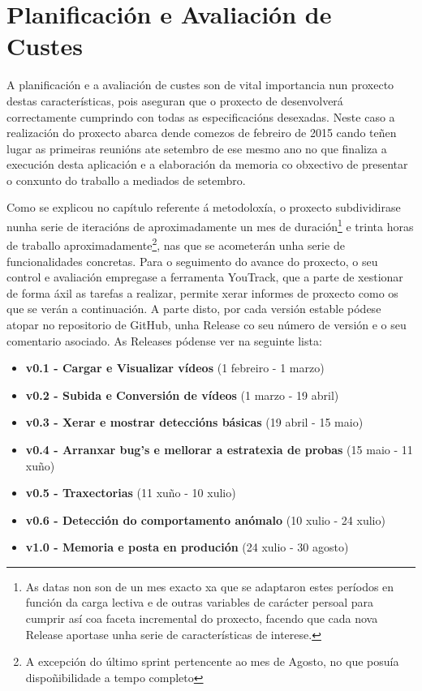 \chapter{Planificación e Avaliación de Custes}

A planificación e a avaliación de custes son de vital importancia nun proxecto destas 
características, pois aseguran que o proxecto de desenvolverá correctamente cumprindo con todas as
especificacións desexadas. Neste caso a realización do proxecto abarca dende comezos de febreiro de
2015 cando teñen lugar as primeiras reunións ate setembro de ese mesmo ano no que finaliza a 
execución desta aplicación e a elaboración da memoria co obxectivo de presentar o conxunto do 
traballo a mediados de setembro.

Como se explicou no capítulo referente á metodoloxía, o proxecto subdividirase nunha serie de 
iteracións de aproximadamente un mes de duración\footnote{As datas non son de un mes exacto xa que
se adaptaron estes períodos en función da carga lectiva e de outras variables de carácter persoal 
para cumprir así coa faceta incremental do proxecto, facendo que cada nova Release aportase unha
serie de características de interese.} e trinta horas de traballo aproximadamente\footnote{ 
A excepción do último sprint pertencente ao mes de Agosto, no que posuía dispoñibilidade a tempo
completo},
nas que se acometerán unha serie de 
funcionalidades concretas. Para o seguimento do avance do proxecto, o seu control e avaliación 
empregase a ferramenta YouTrack, que a parte de xestionar de forma áxil as tarefas a realizar, 
permite xerar informes de proxecto como os que se verán a continuación. A parte disto, por cada 
versión estable pódese atopar no repositorio de GitHub, unha Release co seu número de versión e o 
seu comentario asociado. As Releases pódense ver na seguinte lista:

\begin{itemize}
 \item \textbf{v0.1 - Cargar e Visualizar vídeos} (1 febreiro - 1 marzo) 
 \item \textbf{v0.2 - Subida e Conversión de vídeos} (1 marzo - 19 abril)
 \item \textbf{v0.3 - Xerar e mostrar deteccións básicas} (19 abril - 15 maio)
 \item \textbf{v0.4 - Arranxar bug's e mellorar a estratexia de probas} (15 maio - 11 xuño)
 \item \textbf{v0.5 - Traxectorias}  (11 xuño - 10 xulio)
 \item \textbf{v0.6 - Detección do comportamento anómalo} (10 xulio - 24 xulio)
 \item \textbf{v1.0 - Memoria e posta en produción} (24 xulio - 30 agosto)
\end{itemize}

